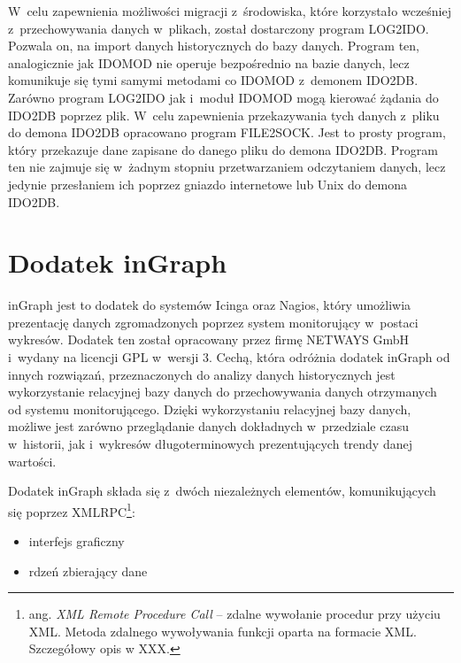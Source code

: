 W~celu zapewnienia możliwości migracji z~środowiska, które korzystało
wcześniej z~przechowywania danych w~plikach, został dostarczony
program LOG2IDO. Pozwala on, na import danych historycznych do bazy
danych. Program ten, analogicznie jak IDOMOD nie operuje bezpośrednio
na bazie danych, lecz komunikuje się tymi samymi metodami co IDOMOD
z~demonem IDO2DB. Zarówno program LOG2IDO jak i~moduł IDOMOD mogą
kierować żądania do IDO2DB poprzez plik. W~celu zapewnienia
przekazywania tych danych z~pliku do demona IDO2DB opracowano program
FILE2SOCK. Jest to prosty program, który przekazuje dane zapisane do
danego pliku do demona IDO2DB. Program ten nie zajmuje się w~żadnym
stopniu przetwarzaniem odczytaniem danych, lecz jedynie przesłaniem ich
poprzez gniazdo internetowe lub Unix do demona IDO2DB.

\section[Dodatek inGraph][Dodatek inGraph]{Dodatek inGraph}
\label{sec:inGraph}

inGraph jest to dodatek do systemów Icinga oraz Nagios, który
umożliwia prezentację danych zgromadzonych poprzez system monitorujący
w~postaci wykresów. Dodatek ten został opracowany przez firmę NETWAYS
GmbH i~wydany na licencji GPL w~wersji 3. Cechą, która odróżnia dodatek
inGraph od innych rozwiązań, przeznaczonych do analizy danych
historycznych jest wykorzystanie relacyjnej bazy danych do
przechowywania danych otrzymanych od systemu monitorującego. Dzięki
wykorzystaniu relacyjnej bazy danych, możliwe jest zarówno
przeglądanie danych dokładnych w~przedziale czasu w~historii, jak
i~wykresów długoterminowych prezentujących trendy danej wartości.

Dodatek inGraph składa się z~dwóch niezależnych elementów,
komunikujących się poprzez XMLRPC\footnote{ang. {\em XML Remote
    Procedure Call} -- zdalne wywołanie procedur przy użyciu
  XML. Metoda zdalnego wywoływania funkcji oparta na formacie
  XML. Szczegółowy opis w XXX.}:

\begin{itemize}
\item interfejs graficzny
\item rdzeń zbierający dane
\end{itemize}


